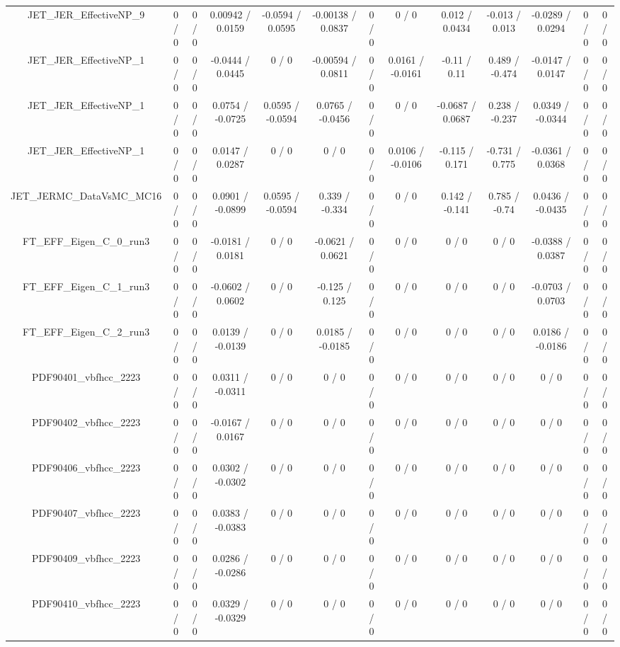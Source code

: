 \documentclass[10pt]{article}
\begin{document}
\begin{table}[htbp]
\begin{center}
\begin{tabular}{|c|c|c|c|c|c|c|c|c|c|c|c|c|}
  JET_JER_EffectiveNP_9 & 0 / 0 & 0 / 0 & 0.00942 / 0.0159 & -0.0594 / 0.0595 & -0.00138 / 0.0837 & 0 / 0 & 0 / 0 & 0.012 / 0.0434 & -0.013 / 0.013 & -0.0289 / 0.0294 & 0 / 0 & 0 / 0 \\ 
  JET_JER_EffectiveNP_1 & 0 / 0 & 0 / 0 & -0.0444 / 0.0445 & 0 / 0 & -0.00594 / 0.0811 & 0 / 0 & 0.0161 / -0.0161 & -0.11 / 0.11 & 0.489 / -0.474 & -0.0147 / 0.0147 & 0 / 0 & 0 / 0 \\ 
  JET_JER_EffectiveNP_1 & 0 / 0 & 0 / 0 & 0.0754 / -0.0725 & 0.0595 / -0.0594 & 0.0765 / -0.0456 & 0 / 0 & 0 / 0 & -0.0687 / 0.0687 & 0.238 / -0.237 & 0.0349 / -0.0344 & 0 / 0 & 0 / 0 \\ 
  JET_JER_EffectiveNP_1 & 0 / 0 & 0 / 0 & 0.0147 / 0.0287 & 0 / 0 & 0 / 0 & 0 / 0 & 0.0106 / -0.0106 & -0.115 / 0.171 & -0.731 / 0.775 & -0.0361 / 0.0368 & 0 / 0 & 0 / 0 \\ 
  JET_JERMC_DataVsMC_MC16 & 0 / 0 & 0 / 0 & 0.0901 / -0.0899 & 0.0595 / -0.0594 & 0.339 / -0.334 & 0 / 0 & 0 / 0 & 0.142 / -0.141 & 0.785 / -0.74 & 0.0436 / -0.0435 & 0 / 0 & 0 / 0 \\ 
  FT_EFF_Eigen_C_0_run3 & 0 / 0 & 0 / 0 & -0.0181 / 0.0181 & 0 / 0 & -0.0621 / 0.0621 & 0 / 0 & 0 / 0 & 0 / 0 & 0 / 0 & -0.0388 / 0.0387 & 0 / 0 & 0 / 0 \\ 
  FT_EFF_Eigen_C_1_run3 & 0 / 0 & 0 / 0 & -0.0602 / 0.0602 & 0 / 0 & -0.125 / 0.125 & 0 / 0 & 0 / 0 & 0 / 0 & 0 / 0 & -0.0703 / 0.0703 & 0 / 0 & 0 / 0 \\ 
  FT_EFF_Eigen_C_2_run3 & 0 / 0 & 0 / 0 & 0.0139 / -0.0139 & 0 / 0 & 0.0185 / -0.0185 & 0 / 0 & 0 / 0 & 0 / 0 & 0 / 0 & 0.0186 / -0.0186 & 0 / 0 & 0 / 0 \\ 
  PDF90401_vbfhcc_2223 & 0 / 0 & 0 / 0 & 0.0311 / -0.0311 & 0 / 0 & 0 / 0 & 0 / 0 & 0 / 0 & 0 / 0 & 0 / 0 & 0 / 0 & 0 / 0 & 0 / 0 \\ 
  PDF90402_vbfhcc_2223 & 0 / 0 & 0 / 0 & -0.0167 / 0.0167 & 0 / 0 & 0 / 0 & 0 / 0 & 0 / 0 & 0 / 0 & 0 / 0 & 0 / 0 & 0 / 0 & 0 / 0 \\ 
  PDF90406_vbfhcc_2223 & 0 / 0 & 0 / 0 & 0.0302 / -0.0302 & 0 / 0 & 0 / 0 & 0 / 0 & 0 / 0 & 0 / 0 & 0 / 0 & 0 / 0 & 0 / 0 & 0 / 0 \\ 
  PDF90407_vbfhcc_2223 & 0 / 0 & 0 / 0 & 0.0383 / -0.0383 & 0 / 0 & 0 / 0 & 0 / 0 & 0 / 0 & 0 / 0 & 0 / 0 & 0 / 0 & 0 / 0 & 0 / 0 \\ 
  PDF90409_vbfhcc_2223 & 0 / 0 & 0 / 0 & 0.0286 / -0.0286 & 0 / 0 & 0 / 0 & 0 / 0 & 0 / 0 & 0 / 0 & 0 / 0 & 0 / 0 & 0 / 0 & 0 / 0 \\ 
  PDF90410_vbfhcc_2223 & 0 / 0 & 0 / 0 & 0.0329 / -0.0329 & 0 / 0 & 0 / 0 & 0 / 0 & 0 / 0 & 0 / 0 & 0 / 0 & 0 / 0 & 0 / 0 & 0 / 0 \\ 

\end{tabular}
\end{center}
\end{table}
\end{document}
